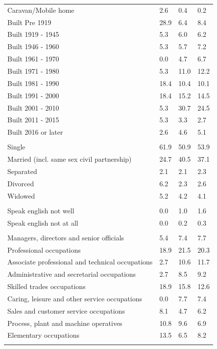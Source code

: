 \documentclass{article}
\begin{document}
\begin{table}[h]
\begin{tabular}{KTTT}
Caravan/Mobile home & 2.6& 0.4& 0.2\\
    \hline
Built Pre 1919 & 28.9&  6.4&  8.4\\
Built 1919 - 1945 & 5.3& 6.0& 6.2\\
Built  1946 - 1960 & 5.3& 5.7& 7.2\\
Built  1961 - 1970 & 0.0& 4.7& 6.7\\
Built  1971 - 1980 &  5.3& 11.0& 12.2\\
Built  1981 - 1990 & 18.4& 10.4& 10.1\\
Built  1991 - 2000 & 18.4& 15.2& 14.5\\
Built  2001 - 2010 &  5.3& 30.7& 24.5\\
Built  2011 - 2015 & 5.3& 3.3& 2.7\\
Built  2016 or later & 2.6& 4.6& 5.1\\
\hline
    \\
    \hline
Single & 61.9& 50.9& 53.9\\
Married (incl. same sex civil partnership) & 24.7& 40.5& 37.1\\
Separated  & 2.1& 2.1& 2.3\\
Divorced  & 6.2& 2.3& 2.6\\
Widowed & 5.2& 4.2& 4.1\\
\hline
    \\ 
    \hline
Speak english not well & 0.0& 1.0& 1.6\\
Speak english not at all & 0.0& 0.2& 0.3\\
\hline
    \\
    \hline
Managers, directors and senior officials & 5.4& 7.4& 7.7\\
Professional occupations & 18.9& 21.5& 20.3\\
Associate professional and technical occupations &  2.7& 10.6& 11.7\\
Administrative and secretarial occupations & 2.7& 8.5& 9.2\\
Skilled trades occupations & 18.9& 15.8& 12.6\\
Caring, leisure and other service occupations & 0.0& 7.7& 7.4\\
Sales and customer service occupations & 8.1& 4.7& 6.2\\
Process, plant and machine operatives & 10.8&  9.6&  6.9\\
Elementary occupations & 13.5&  6.5&  8.2\\
\hline
\end{tabular}
\end{table}
\end{document}
